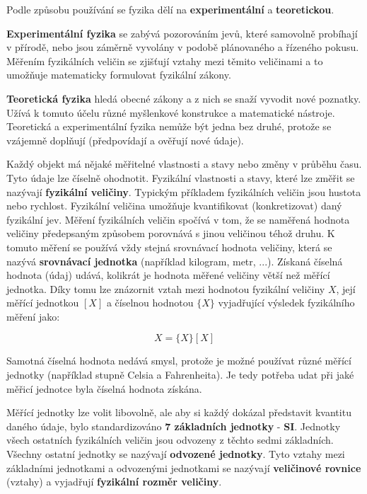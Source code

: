 Podle způsobu používání se fyzika dělí na {\bf experimentální} a {\bf teoretickou}.

{\bf Experimentální fyzika} se zabývá pozorováním jevů, které samovolně probíhají v přírodě, nebo jsou záměrně vyvolány v podobě plánovaného a řízeného pokusu. Měřením fyzikálních veličin se zjišťují vztahy mezi těmito veličinami a to umožňuje matematicky formulovat fyzikální zákony.

{\bf Teoretická fyzika} hledá obecné zákony a z nich se snaží vyvodit nové poznatky. Užívá k tomuto účelu různé myšlenkové konstrukce a matematické nástroje. Teoretická a experimentální fyzika nemůže být jedna bez druhé, protože se vzájemně doplňují (předpovídají a ověřují nové údaje).


Každý objekt má nějaké měřitelné vlastnosti a stavy nebo změny v průběhu času. Tyto údaje lze číselně ohodnotit. Fyzikální vlastnosti a stavy, které lze změřit se nazývají {\bf fyzikální veličiny}. Typickým příkladem fyzikálních veličin jsou hustota nebo rychlost. Fyzikální veličina umožňuje kvantifikovat (konkretizovat) daný fyzikální jev. Měření fyzikálních veličin spočívá v tom, že se naměřená hodnota veličiny předepsaným způsobem porovnává s jinou veličinou téhož druhu. K tomuto měření se používá vždy stejná srovnávací hodnota veličiny, která se nazývá {\bf srovnávací jednotka} (například kilogram, metr, ...). Získaná číselná hodnota (údaj) udává, kolikrát je hodnota měřené veličiny větší než měřící jednotka. Díky tomu lze znázornit vztah mezi hodnotou fyzikální veličiny $X$, její měřící jednotkou $[X]$ a číselnou hodnotou $\{X\}$ vyjadřující výsledek fyzikálního měření jako:

$$ X = \{X\} [X] $$

Samotná číselná hodnota nedává smysl, protože je možné používat různé měřící jednotky (například stupně Celsia a Fahrenheita). Je tedy potřeba udat při jaké měřicí jednotce byla číselná hodnota získána.


Měřící jednotky lze volit libovolně, ale aby si každý dokázal představit kvantitu daného údaje, bylo standardizováno {\bf 7 základních jednotky} - {\bf SI}. Jednotky všech ostatních fyzikálních veličin jsou odvozeny z těchto sedmi základních. Všechny ostatní jednotky se nazývají {\bf odvozené jednotky}. Tyto vztahy mezi základními jednotkami a odvozenými jednotkami se nazývají {\bf veličinové rovnice} (vztahy) a vyjadřují {\bf fyzikální rozměr veličiny}.

